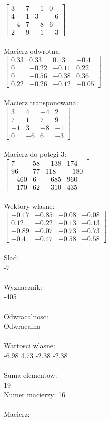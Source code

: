 \documentclass[a4paper,12pt]{article}
\begin{document}
$\begin{bmatrix} 3&7&-1&0\\4&1&3&-6\\-4&7&-8&6\\2&9&-1&-3 \end{bmatrix}$
\\
\\
Macierz odwrotna:\\

$\begin{bmatrix} 0.33&0.33&0.13&-0.4\\0&-0.22&-0.11&0.22\\0&-0.56&-0.38&0.36\\0.22&-0.26&-0.12&-0.05 \end{bmatrix}$
\\
\\
Macierz transponowana:\\

$\begin{bmatrix} 3&4&-4&2\\7&1&7&9\\-1&3&-8&-1\\0&-6&6&-3 \end{bmatrix}$
\\
\\
Macierz do potegi 3:\\

$\begin{bmatrix} 7&58&-138&174\\96&77&118&-180\\-460&6&-685&960\\-170&62&-310&435 \end{bmatrix}$
\\
\\
Wektory wlasne:\\

$\begin{bmatrix} -0.17&-0.85&-0.08&-0.08\\0.12&-0.22&-0.13&-0.13\\-0.89&-0.07&-0.73&-0.73\\-0.4&-0.47&-0.58&-0.58 \end{bmatrix}$
\\
\\
Slad:\\
-7
\\
\\
Wyznacznik:\\
-405
\\
\\
Odwracalnosc:\\
Odwracalna
\\
\\
Wartosci wlasne:\\
-6.98 4.73 -2.38 -2.38
\\
\\
Suma elementow:\\
19
\\
\newpage
Numer macierzy:
16
\\
\\
Macierz:\\
\end{document}

